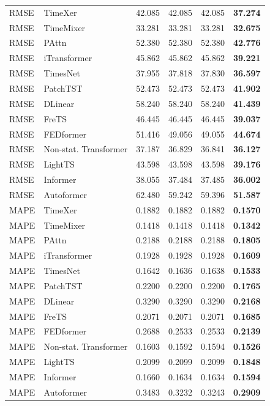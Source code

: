 \begin{longtable}{llrrrr}
\midrule
RMSE & TimeXer & 42.085 & 42.085 & 42.085 & \textbf{37.274} \\
RMSE & TimeMixer & 33.281 & 33.281 & 33.281 & \textbf{32.675} \\
RMSE & PAttn & 52.380 & 52.380 & 52.380 & \textbf{42.776} \\
RMSE & iTransformer & 45.862 & 45.862 & 45.862 & \textbf{39.221} \\
RMSE & TimesNet & 37.955 & 37.818 & 37.830 & \textbf{36.597} \\
RMSE & PatchTST & 52.473 & 52.473 & 52.473 & \textbf{41.902} \\
RMSE & DLinear & 58.240 & 58.240 & 58.240 & \textbf{41.439} \\
RMSE & FreTS & 46.445 & 46.445 & 46.445 & \textbf{39.037} \\
RMSE & FEDformer & 51.416 & 49.056 & 49.055 & \textbf{44.674} \\
RMSE & Non-stat. Transformer & 37.187 & 36.829 & 36.841 & \textbf{36.127} \\
RMSE & LightTS & 43.598 & 43.598 & 43.598 & \textbf{39.176} \\
RMSE & Informer & 38.055 & 37.484 & 37.485 & \textbf{36.002} \\
RMSE & Autoformer & 62.480 & 59.242 & 59.396 & \textbf{51.587} \\
\midrule
MAPE & TimeXer & 0.1882 & 0.1882 & 0.1882 & \textbf{0.1570} \\
MAPE & TimeMixer & 0.1418 & 0.1418 & 0.1418 & \textbf{0.1342} \\
MAPE & PAttn & 0.2188 & 0.2188 & 0.2188 & \textbf{0.1805} \\
MAPE & iTransformer & 0.1928 & 0.1928 & 0.1928 & \textbf{0.1609} \\
MAPE & TimesNet & 0.1642 & 0.1636 & 0.1638 & \textbf{0.1533} \\
MAPE & PatchTST & 0.2200 & 0.2200 & 0.2200 & \textbf{0.1765} \\
MAPE & DLinear & 0.3290 & 0.3290 & 0.3290 & \textbf{0.2168} \\
MAPE & FreTS & 0.2071 & 0.2071 & 0.2071 & \textbf{0.1685} \\
MAPE & FEDformer & 0.2688 & 0.2533 & 0.2533 & \textbf{0.2139} \\
MAPE & Non-stat. Transformer & 0.1603 & 0.1592 & 0.1594 & \textbf{0.1526} \\
MAPE & LightTS & 0.2099 & 0.2099 & 0.2099 & \textbf{0.1848} \\
MAPE & Informer & 0.1660 & 0.1634 & 0.1634 & \textbf{0.1594} \\
MAPE & Autoformer & 0.3483 & 0.3232 & 0.3243 & \textbf{0.2909} \\
\end{longtable}
\endgroup

